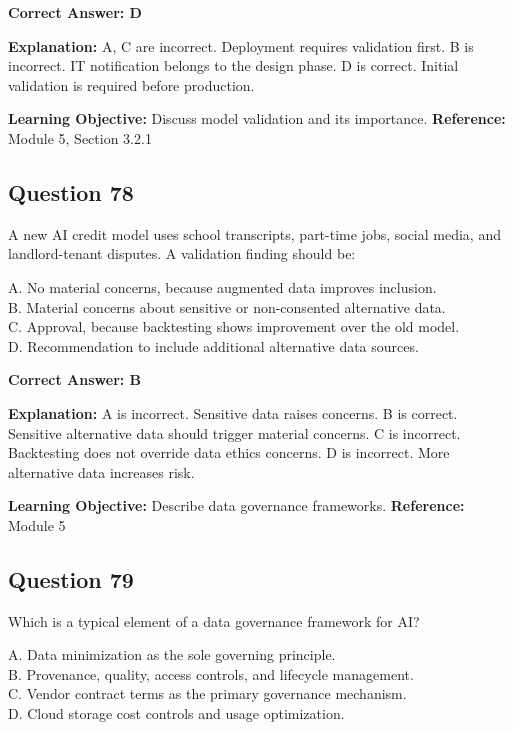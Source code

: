 \documentclass[11pt]{article}
\begin{document}
	\vspace{0.4em}
	\textbf{Correct Answer: D}
	
	\textbf{Explanation:}
	A, C are incorrect. Deployment requires validation first.
	B is incorrect. IT notification belongs to the design phase.
	D is correct. Initial validation is required before production.
	
	\textbf{Learning Objective:} Discuss model validation and its importance.
	\textbf{Reference:} Module 5, Section 3.2.1
	
	\subsection*{Question 78}
	A new AI credit model uses school transcripts, part-time jobs, social
	media, and landlord-tenant disputes. A validation finding should be:
	
	A. No material concerns, because augmented data improves inclusion.\\
	B. Material concerns about sensitive or non-consented alternative data.\\
	C. Approval, because backtesting shows improvement over the old model.\\
	D. Recommendation to include additional alternative data sources.
	
	\vspace{0.4em}
	\textbf{Correct Answer: B}
	
	\textbf{Explanation:}
	A is incorrect. Sensitive data raises concerns.
	B is correct. Sensitive alternative data should trigger material concerns.
	C is incorrect. Backtesting does not override data ethics concerns.
	D is incorrect. More alternative data increases risk.
	
	\textbf{Learning Objective:} Describe data governance frameworks.
	\textbf{Reference:} Module 5
	
	\subsection*{Question 79}
	Which is a typical element of a data governance framework for AI?
	
	A. Data minimization as the sole governing principle.\\
	B. Provenance, quality, access controls, and lifecycle management.\\
	C. Vendor contract terms as the primary governance mechanism.\\
	D. Cloud storage cost controls and usage optimization.
	
\end{document}
